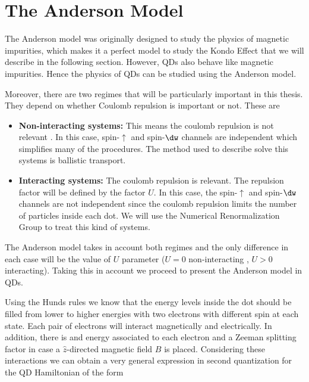 



\section{The Anderson Model}
The Anderson model \citep{anderson_localized_1961} was originally designed to study the physics of magnetic impurities, which makes it a perfect model to study the Kondo Effect that we will describe in the following section. However,  QDs also behave like magnetic impurities. Hence the physics of QDs can be studied using the Anderson model.

Moreover, there are two regimes that  will be particularly important in this thesis.  They depend on whether Coulomb repulsion is important or not. These are
\begin{itemize}
    \item \textbf{Non-interacting systems:} This means the coulomb repulsion is not relevant . In this case, spin-$\uparrow$ and spin-$\dw$ channels are independent which simplifies many of the procedures. The method used to describe solve this systems is ballistic transport. 
    \item \textbf{Interacting systems:} The coulomb repulsion is relevant. The repulsion factor will be defined by the factor $U$. In this case, the spin-$\uparrow$ and spin-$\dw$ channels are not independent since the coulomb repulsion limits the number of particles inside each dot. We will use the Numerical Renormalization Group to treat this kind of systems.  
\end{itemize}


The Anderson model takes in account both regimes and  the only difference in each case will be the value of $U$ parameter ($U=0$ non-interacting , $U>0$ interacting). Taking this in account we proceed to present the Anderson model in QDs.

Using the Hunds rules we know that the energy levels inside the dot should be filled from lower to higher energies with two electrons with different spin at each state. Each pair of electrons will interact magnetically and electrically. In addition, there is and energy associated to each electron and a Zeeman splitting factor in case a $\hat{z}$-directed magnetic field $B$ is placed.  Considering these interactions we can obtain a very general expression in second quantization for the QD Hamiltonian
of the form \citep[(3.2)]{sindel_numerical_2005}

